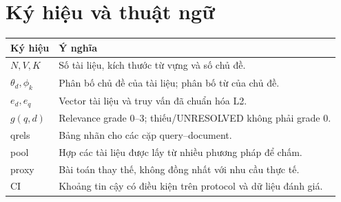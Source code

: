 \documentclass[12pt,a4paper,oneside]{report}
\begin{document}
\chapter*{Ký hiệu và thuật ngữ}
\begin{tabularx}{\textwidth}{lX}
\toprule Ký hiệu & Ý nghĩa \\\midrule
$N,V,K$ & Số tài liệu, kích thước từ vựng và số chủ đề.\\
$\theta_d,\phi_k$ & Phân bố chủ đề của tài liệu; phân bố từ của chủ đề.\\
$e_d,e_q$ & Vector tài liệu và truy vấn đã chuẩn hóa L2.\\
$g(q,d)$ & Relevance grade 0--3; thiếu/UNRESOLVED không phải grade 0.\\
qrels & Bảng nhãn cho các cặp query--document.\\
pool & Hợp các tài liệu được lấy từ nhiều phương pháp để chấm.\\
proxy & Bài toán thay thế, không đồng nhất với nhu cầu thực tế.\\
CI & Khoảng tin cậy có điều kiện trên protocol và dữ liệu đánh giá.\\
\bottomrule
\end{tabularx}
\clearpage
{}





\clearpage
{}
{}


\appendix

\end{document}
